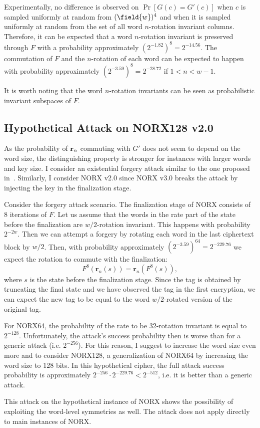 Experimentally, no difference is observed on $\Pr[G(c) = G'(c)]$ when $c$ is sampled uniformly at random from $(\field{w})^4$ and when it is sampled uniformly at random from the set of all word $n$-rotation invariant columns. Therefore, it can be expected that a word $n$-rotation invariant is preserved through $F$ with a probability approximately $(2^{-1.82})^8 = 2^{-14.56}$. The commutation of $F$ and the $n$-rotation of each word can be expected to happen with probability approximately $(2^{-3.59})^8 = 2^{-28.72}$ if $1 < n < w-1$.

It is worth noting that the word $n$-rotation invariants can be seen as probabilistic invariant subspaces of $F$.


\subsection{Hypothetical Attack on NORX128 v2.0}

As the probability of $\mathbf{r}_n$ commuting with $G'$ does not seem to depend on the word size, the distinguishing property is stronger for instances with larger words and key size. I consider an existential forgery attack similar to the one proposed in~\cite{NORXfse}. Similarly, I consider NORX v2.0 since NORX v3.0 breaks the attack by injecting the key in the finalization stage.

\newcommand\rrr{\mathbf{r}}
Consider the forgery attack scenario. The finalization stage of NORX consists of 8 iterations of $F$.
Let us assume that the words in the rate part of the state before the finalization are $w/2$-rotation invariant. This happens with probability $2^{-2w}$. Then we can attempt a forgery by rotating each word in the last ciphertext block by $w/2$. Then, with probability approximately $(2^{-3.59})^{64} = 2^{-229.76}$ we expect the rotation to commute with the finalization:
$$
F^8(\rrr_n(s)) = \rrr_n(F^8(s)), 
$$
where $s$ is the state before the finalization stage. Since the tag is obtained by truncating the final state and we have observed the tag in the first encryption, we can expect the new tag to be equal to the word $w/2$-rotated version of the original tag.

For NORX64, the probability of the rate to be $32$-rotation invariant is equal to $2^{-128}$. Unfortunately, the attack's success probability then is worse than for a generic attack (i.e. $2^{-256}$). For this reason, I suggest to increase the word size even more and to consider NORX128, a generalization of NORX64 by increasing the word size to 128 bits. In this hypothetical cipher, the full attack success probability is approximately $2^{-256}\cdot 2^{-229.76} < 2^{-512}$, i.e. it is better than a generic attack.

This attack on the hypothetical instance of NORX shows the possibility of exploiting the word-level symmetries as well. The attack does not apply directly to main instances of NORX.
